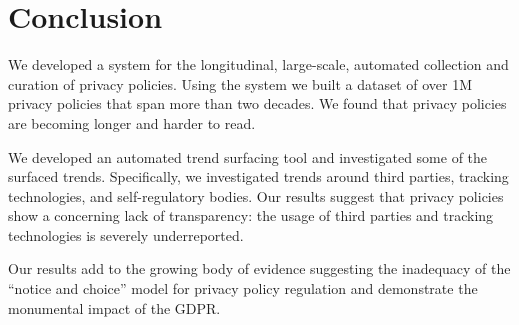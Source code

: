\section{Conclusion}
\label{sec:ppot:conclusion}
We developed a system for the longitudinal, large-scale, automated collection and curation of privacy policies. Using the system we built a dataset of over 1M privacy policies that span more than two decades. We found that privacy policies are becoming longer and harder to read.

We developed an automated trend surfacing tool and investigated some of the surfaced trends. Specifically, we investigated trends around third parties, tracking technologies, and self-regulatory bodies. Our results suggest that privacy policies show a concerning lack of transparency: the usage of third parties and tracking technologies is severely underreported.

Our results add to the growing body of evidence suggesting the inadequacy of the ``notice and choice'' model for privacy policy regulation and demonstrate the monumental impact of the GDPR.





